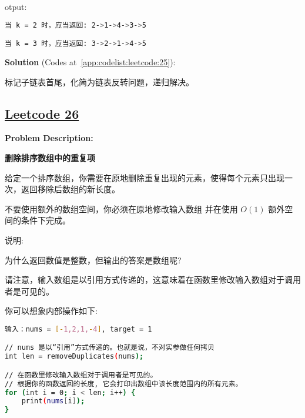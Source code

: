 otput:\par

\begin{lstlisting}[language=bash]
当 k = 2 时，应当返回: 2->1->4->3->5

当 k = 3 时，应当返回: 3->2->1->4->5
\end{lstlisting}

\textbf{Solution }(Codes at~\ref{app:codelist:leetcode:25}):\par

标记子链表首尾，化简为链表反转问题，递归解决。\par



\subsection{\href{https://leetcode-cn.com/}{Leetcode 26}}\label{app:problemlist:leetcode:26}

\textbf{Problem Description:}\par

\textbf{删除排序数组中的重复项}\par

给定一个排序数组，你需要在原地删除重复出现的元素，使得每个元素只出现一次，返回移除后数组的新长度。\par

不要使用额外的数组空间，你必须在原地修改输入数组 并在使用 $ O(1) $ 额外空间的条件下完成。\par

说明:\par

为什么返回数值是整数，但输出的答案是数组呢?\par

请注意，输入数组是以引用方式传递的，这意味着在函数里修改输入数组对于调用者是可见的。\par

你可以想象内部操作如下:\par

\begin{lstlisting}[language=bash]
输入：nums = [-1,2,1,-4], target = 1

// nums 是以“引用”方式传递的。也就是说，不对实参做任何拷贝
int len = removeDuplicates(nums);

// 在函数里修改输入数组对于调用者是可见的。
// 根据你的函数返回的长度, 它会打印出数组中该长度范围内的所有元素。
for (int i = 0; i < len; i++) {
    print(nums[i]);
}
\end{lstlisting}


